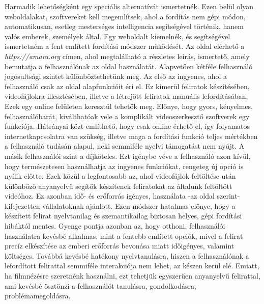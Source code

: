 Harmadik lehetőségként egy speciális alternatívát ismertetnék. Ezen belül olyan weboldalakat, szoftvereket kell megemlítsek, ahol a fordítás nem gépi módon, automatikusan, esetleg mesterséges intelligencia segítségével történik, hanem valós emberek, személyek által. Egy weboldalt kiemelnék,  és segítségével ismertetném a fent említett fordítási módszer működését. Az oldal elérhető a \textit{https://amara.org} címen, ahol megtalálható a részletes leírás, ismertető, amely bemutatja a felhasználónak az oldal használatát. Alapvetően kétféle felhasználó jogosultsági szintet különböztethetünk meg. Az első az ingyenes, ahol a felhasználó csak az oldal alapfunkcióit éri el. Ez kimerül feliratok készítésében, videofájlokra illesztésében, illetve a létrejött feliratok manuális lefordításában. Ezek egy online felületen keresztül tehetők meg. Előnye, hogy gyors, kényelmes, felhasználóbarát, kiválthatóak vele a komplikált videoszerkesztő szoftverek egy funkciója. Hátrányai közt említhető, hogy csak online érhető el, így folyamatos internetkapcsolatra van szükség, illetve maga a fordítási funkció teljes mértékben a felhasználó tudásán alapul, neki semmiféle nyelvi támogatást nem nyújt. A másik felhasználói szint a díjköteles. Ezt igénybe véve a felhasználó azon kívül, hogy természetesen használhatja az ingyenes funkciókat, rengeteg új opció is nyílik előtte. Ezek közül a legfontosabb az, ahol videofájlok feltöltése után különböző anyanyelvű segítők készítenek feliratokat az általunk feltöltött videóhoz. Ez azonban idő- és erőforrás igényes, használata -az oldal szerint- kifejezetten vállalatoknak ajánlott. Ezen módszer hatalmas előnye, hogy a készített felirat nyelvtanilag és szemantikailag biztosan helyes, gépi fordítási hibáktól mentes. Gyenge pontja azonban az, hogy otthoni, felhasználói használatra kevésbé alkalmas, mint a fentebb említett opciók, mivel a felirat precíz elkészítése az emberi erőforrás bevonása miatt időigényes, valamint költséges. Továbbá kevésbé hatékony nyelvtanulásra, hiszen a felhasználónak a lefordított felirattal semmiféle interakciója nem lehet, az készen kerül elé. Emiatt, ha filmnézésre szeretnénk használni, ezt tehetjük egyszerűen anyanyelvű felirattal, ami kevésbé ösztönzi a felhasználót tanulásra, gondolkodásra, problémamegoldásra.

